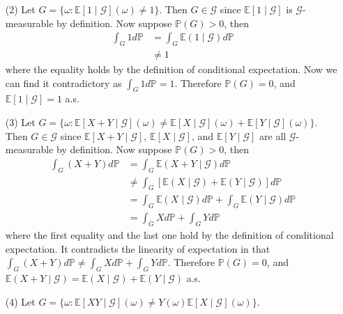 \begin{enumerate}
    \item[(2)] Let $G = \{\omega: \mathbb{E}[1 \mid \mathcal{G}](\omega) \neq 1 \}$.
    Then $G \in \mathcal{G}$ since $\mathbb{E}[1 \mid \mathcal{G}]$ is $\mathcal{G}$-measurable by definition.
    Now suppose $\mathbb{P}(G) > 0$, then
    \begin{equation}
        \begin{split}
            \int_{G} 1 d \mathbb{P}
            &= \int_{G} \mathbb{E}(1 \mid \mathcal{G}) d \mathbb{P} \\
            &\neq 1
        \end{split}
    \end{equation}
    where the equality holds by the definition of conditional expectation.
    Now we can find it contradictory as $\int_{G} 1 d \mathbb{P} = 1$.
    Therefore $\mathbb{P}(G) = 0$, and $\mathbb{E}[1 \mid \mathcal{G}] = 1$ a.s.
    \item[(3)] Let $G = \{\omega: \mathbb{E}[X + Y \mid \mathcal{G}](\omega) \neq \mathbb{E}[X \mid \mathcal{G}](\omega) + \mathbb{E}[Y \mid \mathcal{G}](\omega) \}$.
    Then $G \in \mathcal{G}$ since $\mathbb{E}[X + Y \mid \mathcal{G}]$, $\mathbb{E}[X \mid \mathcal{G}]$, and $\mathbb{E}[Y \mid \mathcal{G}]$ are all $\mathcal{G}$-measurable by definition.
    Now suppose $\mathbb{P}(G) > 0$, then
    \begin{equation}
        \begin{split}
            \int_{G} (X + Y) d \mathbb{P}
            &= \int_{G} \mathbb{E}(X + Y \mid \mathcal{G}) d \mathbb{P} \\
            &\neq \int_{G} [\mathbb{E}(X \mid \mathcal{G}) + \mathbb{E}(Y \mid \mathcal{G})] d \mathbb{P} \\
            &= \int_{G} \mathbb{E}(X \mid \mathcal{G}) d \mathbb{P} + \int_{G} \mathbb{E}(Y \mid \mathcal{G}) d \mathbb{P} \\
            &= \int_{G} X d \mathbb{P} + \int_{G} Y d \mathbb{P}
        \end{split}
    \end{equation}
    where the first equality and the last one hold by the definition of conditional expectation.
    It contradicts the linearity of expectation in that $\int_{G} (X + Y) d \mathbb{P} \neq \int_{G} X d \mathbb{P} + \int_{G} Y d \mathbb{P}$.
    Therefore $\mathbb{P}(G) = 0$, and $\mathbb{E}(X + Y \mid \mathcal{G}) = \mathbb{E}(X \mid \mathcal{G}) + \mathbb{E}(Y \mid \mathcal{G})$ a.s.
    \item[(4)] Let $G = \{\omega: \mathbb{E}[X Y \mid \mathcal{G}](\omega) \neq Y(\omega) \mathbb{E}[X \mid \mathcal{G}](\omega) \}$.

\end{enumerate}
